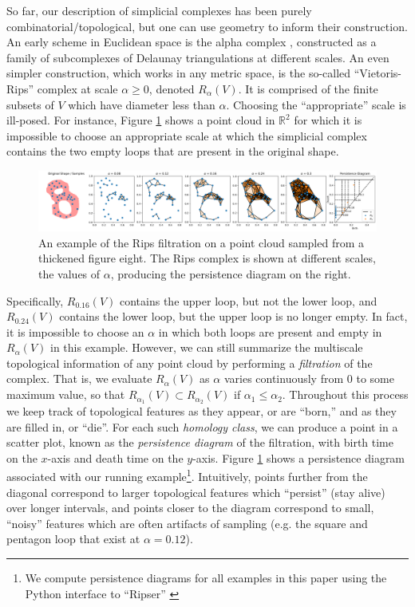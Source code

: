 \documentclass[11pt]{article}
\theoremstyle{definition}
\theoremstyle{remark}
\begin{document}
    So far, our description of simplicial complexes has been purely combinatorial/topological,
    but one can use geometry to inform their construction.
    An early scheme in Euclidean space is  the alpha complex \cite{edelsbrunner1994three},
    constructed as a family of subcomplexes of  Delaunay triangulations at different scales.
    An even simpler construction, which works  in any metric space, is the so-called ``Vietoris-Rips''  complex at scale $\alpha \geq 0$,
    denoted $R_\alpha(V)$.
    It is comprised of the finite subsets of $V$ which have diameter less than $\alpha$.
    Choosing the ``appropriate'' scale  is ill-posed.
    For instance, Figure \ref{fig:TDAExample} shows a point cloud in $\mathbb{R}^2$ for which it is impossible to choose an appropriate scale at which the simplicial complex contains the two empty loops that are present in the original shape.

    \begin{figure}[htb!]
        \centering
        \includegraphics[width=\textwidth]{TDAExample.png}
        \caption{An example of the Rips filtration on a point cloud sampled from a thickened figure eight.
         The Rips complex is shown at different scales, the values of $\alpha$, producing the persistence diagram on the right.}
        \label{fig:TDAExample}
    \end{figure}

    Specifically, $R_{0.16}(V)$ contains the upper loop, but not the lower loop, and $R_{0.24}(V)$ contains the lower loop, but the upper loop is no longer empty.
    In fact, it is impossible to  choose an $\alpha$ in which both loops are present and empty in $R_{\alpha}(V)$ in this example.
    However, we can still summarize the multiscale topological information of any point cloud by performing a {\em filtration} of the complex.
    That is, we evaluate $R_{\alpha}(V)$ as $\alpha$ varies continuously from $0$ to some maximum value,
    so that $R_{\alpha_1}(V) \subset R_{\alpha_2}(V)$ if $\alpha_1 \leq \alpha_2$.
    Throughout this process we keep track of topological features as they appear, or are ``born,'' and as they are filled in, or ``die''.
    For each such {\em homology class}, we can produce a point in a scatter plot, known as the {\em persistence diagram} of the filtration,
    with birth time on the $x$-axis and death time on the $y$-axis.
    Figure \ref{fig:TDAExample} shows a persistence diagram associated with our running example\footnote{We compute persistence diagrams for all examples in this paper using the Python interface to ``Ripser'' \cite{ripser, ripserpy}}.  Intuitively, points further from the diagonal correspond to larger topological features which ``persist'' (stay alive) over longer intervals, and points closer to the diagram correspond to small, ``noisy'' features which are often artifacts of sampling (e.g. the square and pentagon loop that exist at $\alpha = 0.12$).
\end{document}
